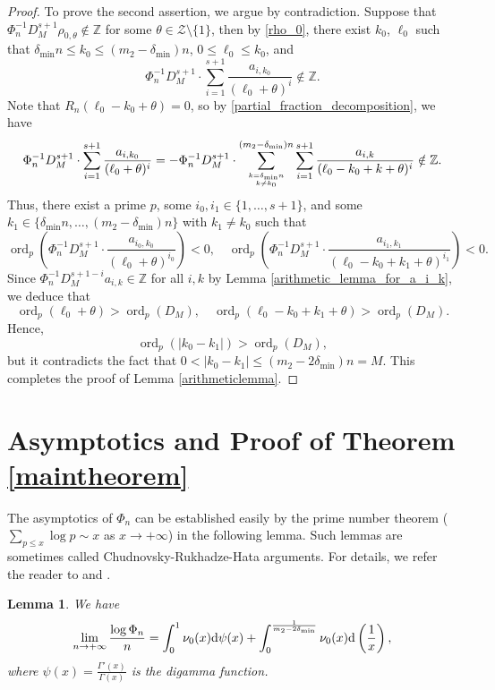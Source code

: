 \documentclass[11pt]{amsart}
\newtheorem{lemma}[theorem]{Lemma}
\numberwithin{equation}{section}
\begin{document}
\begin{proof}
To prove the second assertion, we argue by contradiction. Suppose that $ \Phi_{n}^{-1} D_{M}^{s+1} \rho_{0,\theta} \notin \mathbb{Z}$ for some $\theta \in \mathcal{Z} \setminus\{1\}$, then by \eqref{rho_0}, there exist $k_0$, $\ell_0$ such that $\delta_{\min}n \leqslant k_0 \leqslant (m_2 - \delta_{\min})n$, $0 \leqslant \ell_0 \leqslant k_0$, and
\[ \Phi_{n}^{-1} D_{M}^{s+1} \cdot \sum_{i=1}^{s+1} \frac{a_{i,k_0}}{(\ell_0+\theta)^{i}} \notin \mathbb{Z}. \]
Note that $R_n(\ell_0-k_0+\theta) = 0$, so by \eqref{partial_fraction_decomposition}, we have
\[ \Phi_{n}^{-1} D_{M}^{s+1} \cdot \sum_{i=1}^{s+1} \frac{a_{i,k_0}}{(\ell_0+\theta)^{i}} = - \Phi_{n}^{-1} D_{M}^{s+1} \cdot \sum_{k=\delta_{\min}n \atop k \neq k_0}^{(m_2 - \delta_{\min})n} \sum_{i=1}^{s+1} \frac{a_{i,k}}{(\ell_0-k_0+k+\theta)^{i}} \notin \mathbb{Z}. \]
Thus, there exist a prime $p$, some $i_0,i_1 \in \{ 1,\ldots,s+1 \} $, and some $k_1 \in \{ \delta_{\min}n,\ldots,  (m_2 - \delta_{\min})n \}$ with $k_1 \neq k_0$ such that
\[ \operatorname{ord}_p\left( \Phi_{n}^{-1} D_{M}^{s+1} \cdot \frac{a_{i_0,k_0}}{(\ell_0+\theta)^{i_0}}  \right) < 0, \quad \operatorname{ord}_p\left( \Phi_{n}^{-1} D_{M}^{s+1} \cdot \frac{a_{i_1,k_1}}{(\ell_0-k_0+k_1+\theta)^{i_1}}  \right) < 0. \]
Since $\Phi_{n}^{-1} D_{M}^{s+1-i} a_{i,k} \in \mathbb{Z}$ for all $i,k$ by Lemma \ref{arithmetic_lemma_for_a_i_k}, we deduce that
\[ \operatorname{ord}_p\left( \ell_0+\theta  \right) > \operatorname{ord}_p\left( D_M \right), \quad \operatorname{ord}_p\left( \ell_0-k_0+k_1+\theta  \right) > \operatorname{ord}_p\left( D_M \right). \]
Hence,
\[  \operatorname{ord}_p\left( |k_0-k_1| \right) > \operatorname{ord}_p\left( D_M \right), \]
but it contradicts the fact that $0 < |k_0-k_1| \leqslant (m_2 - 2\delta_{\min})n = M$. This completes the proof of Lemma \ref{arithmeticlemma}.
\end{proof}

\bigskip

\section{Asymptotics and Proof of Theorem \ref{maintheorem} }\label{Section_4}

The asymptotics of $\Phi_n$ can be established easily by the prime number theorem ($\sum_{p \leqslant x} \log p \sim x$ as $x \rightarrow +\infty$) in the following lemma. Such lemmas are sometimes called Chudnovsky-Rukhadze-Hata arguments. For details, we refer the reader to \cite[p. 341]{Ha93} and \cite[Lemma 4.4]{Zu02}.
\begin{lemma}\label{Phi}
We have
\[
\lim_{n \rightarrow +\infty} \frac{\log \Phi_n}{n} = \int_{0}^{1} \nu_0(x) {\rm d} \psi(x) + \int_{0}^{\frac{1}{m_2-2\delta_{\min}}} \nu_0(x) {\rm d} \left( \frac{1}{x} \right),
\]
where $\psi(x) = \frac{\Gamma'(x)}{\Gamma(x)}$ is the digamma function.
\end{lemma}
\end{document}
